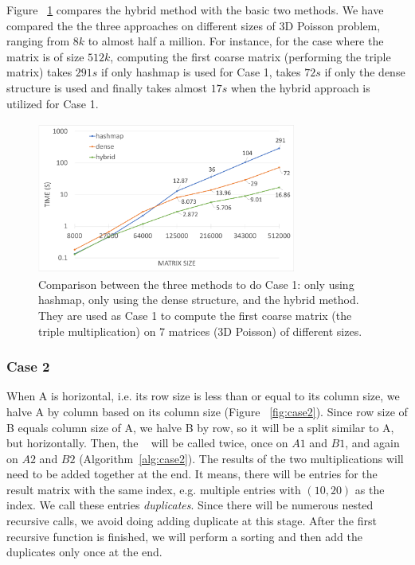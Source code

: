 Figure ~\ref{fig:mix} compares the hybrid method with the basic two methods. We have compared the the three approaches on different sizes of 3D Poisson problem, ranging from $8k$ to almost half a million. For instance, for the case where the matrix is of size $512k$, computing the first coarse matrix (performing the triple matrix) takes $291s$ if only hashmap is used for Case 1, takes $72s$ if only the dense structure is used and finally takes almost $17s$ when the hybrid approach is utilized for Case 1.

\begin{figure}[tbh]
 \centering
 \includegraphics[width=8.5cm,height=5cm]{./figures/mix.pdf}
 \caption{Comparison between the three methods to do Case 1: only using hashmap, only using the dense structure, and the hybrid method. They are used as Case 1 to compute the first coarse matrix (the triple multiplication) on 7 matrices (3D Poisson) of different sizes.}
 \label{fig:mix}
\end{figure}



\subsubsection{Case 2}
\label{sec:case2}
When A is horizontal, i.e. its row size is less than or equal to its column size, we halve A by column based on its column size (Figure ~\ref{fig:case2}). Since row size of B equals column size of A, we halve B by row, so it will be a split similar to A, but horizontally.
Then, the \recmm~ will be called twice, once on $A1$ and $B1$, and again on $A2$ and $B2$ (Algorithm~\ref{alg:case2}). The results of the two multiplications will need to be added together at the end. It means, there will be entries for the result matrix with the same index, e.g. multiple entries with $(10, 20)$ as the index. We call these entries \textit{duplicates}. Since there will be numerous nested recursive calls, we avoid doing adding duplicate at this stage. After the first recursive function is finished, we will perform a sorting and then add the duplicates only once at the end.

